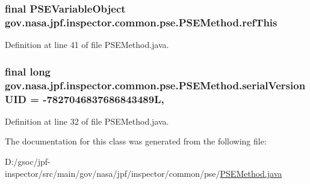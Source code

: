 \subsubsection[{\texorpdfstring{ref\+This}{refThis}}]{\setlength{\rightskip}{0pt plus 5cm}final {\bf P\+S\+E\+Variable\+Object} gov.\+nasa.\+jpf.\+inspector.\+common.\+pse.\+P\+S\+E\+Method.\+ref\+This\hspace{0.3cm}{\ttfamily [private]}}\hypertarget{classgov_1_1nasa_1_1jpf_1_1inspector_1_1common_1_1pse_1_1_p_s_e_method_ab4d1897315c76b6b214e57ef5ba072f8}{}\label{classgov_1_1nasa_1_1jpf_1_1inspector_1_1common_1_1pse_1_1_p_s_e_method_ab4d1897315c76b6b214e57ef5ba072f8}


Definition at line 41 of file P\+S\+E\+Method.\+java.

\subsubsection[{\texorpdfstring{serial\+Version\+U\+ID}{serialVersionUID}}]{\setlength{\rightskip}{0pt plus 5cm}final long gov.\+nasa.\+jpf.\+inspector.\+common.\+pse.\+P\+S\+E\+Method.\+serial\+Version\+U\+ID = -\/7827046837686843489L\hspace{0.3cm}{\ttfamily [static]}, {\ttfamily [private]}}\hypertarget{classgov_1_1nasa_1_1jpf_1_1inspector_1_1common_1_1pse_1_1_p_s_e_method_a5895256c706bd2b2dc8f014ac22f485c}{}\label{classgov_1_1nasa_1_1jpf_1_1inspector_1_1common_1_1pse_1_1_p_s_e_method_a5895256c706bd2b2dc8f014ac22f485c}


Definition at line 32 of file P\+S\+E\+Method.\+java.



The documentation for this class was generated from the following file\+:\begin{DoxyCompactItemize}
\item 
D\+:/gsoc/jpf-\/inspector/src/main/gov/nasa/jpf/inspector/common/pse/\hyperlink{_p_s_e_method_8java}{P\+S\+E\+Method.\+java}\end{DoxyCompactItemize}
